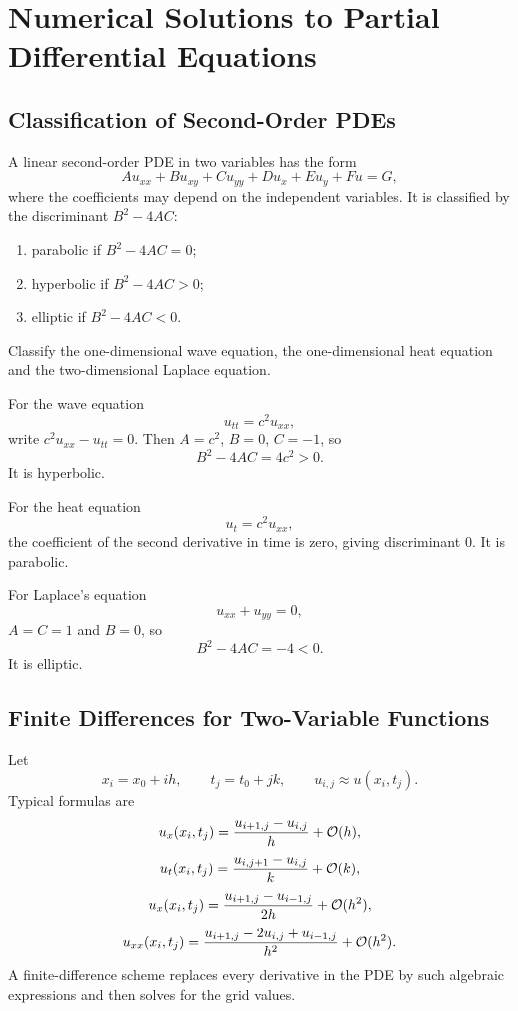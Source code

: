 \chapter{Numerical Solutions to Partial Differential Equations}

\section{Classification of Second-Order PDEs}

\begin{definition}
A linear second-order PDE in two variables has the form
\[
 Au_{xx}+Bu_{xy}+Cu_{yy}+Du_x+Eu_y+Fu=G,
\]
where the coefficients may depend on the independent variables.  It is classified by the discriminant $B^2-4AC$:
\begin{enumerate}[label=(\alph*),leftmargin=2.7em]
  \item parabolic if $B^2-4AC=0$;
  \item hyperbolic if $B^2-4AC>0$;
  \item elliptic if $B^2-4AC<0$.
\end{enumerate}
\end{definition}

\begin{example}
Classify the one-dimensional wave equation, the one-dimensional heat equation and the two-dimensional Laplace equation.
\end{example}

\begin{solution}[4.5cm]
For the wave equation
\[
 u_{tt}=c^2u_{xx},
\]
write $c^2u_{xx}-u_{tt}=0$.  Then $A=c^2$, $B=0$, $C=-1$, so
\[
 B^2-4AC=4c^2>0.
\]
It is hyperbolic.

For the heat equation
\[
 u_t=c^2u_{xx},
\]
the coefficient of the second derivative in time is zero, giving discriminant $0$.  It is parabolic.

For Laplace's equation
\[
 u_{xx}+u_{yy}=0,
\]
$A=C=1$ and $B=0$, so
\[
 B^2-4AC=-4<0.
\]
It is elliptic.
\end{solution}

\section{Finite Differences for Two-Variable Functions}

Let
\[
 x_i=x_0+ih,
 \qquad
 t_j=t_0+jk,
 \qquad
 u_{i,j}\approx u(x_i,t_j).
\]
Typical formulas are
\[
 u_x(x_i,t_j)
 =\frac{u_{i+1,j}-u_{i,j}}h+\mathcal O(h),
\]
\[
 u_t(x_i,t_j)
 =\frac{u_{i,j+1}-u_{i,j}}k+\mathcal O(k),
\]
\[
 u_x(x_i,t_j)
 =\frac{u_{i+1,j}-u_{i-1,j}}{2h}+\mathcal O(h^2),
\]
\[
 u_{xx}(x_i,t_j)
 =\frac{u_{i+1,j}-2u_{i,j}+u_{i-1,j}}{h^2}
 +\mathcal O(h^2).
\]
A finite-difference scheme replaces every derivative in the PDE by such algebraic expressions and then solves for the grid values.

